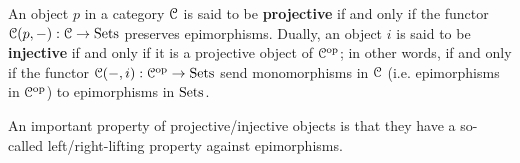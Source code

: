                 \begin{definition} \label{def: projective_and_injective_objects}  
                    An object $p$ in a category $\mathcal{C}$ is said to be \textbf{projective} if and only if the functor $\mathcal{C}(p, -): \mathcal{C} \to \mathrm{Sets}$ preserves epimorphisms. Dually, an object $i$ is said to be \textbf{injective} if and only if it is a projective object of $\mathcal{C}^{\mathrm{op}}$; in other words, if and only if the functor $\mathcal{C}(-, i): \mathcal{C}^{\mathrm{op}} \to \mathrm{Sets}$ send monomorphisms in $\mathcal{C}$ (i.e. epimorphisms in $\mathcal{C}^{\mathrm{op}}$) to epimorphisms in $\mathrm{Sets}$.
                \end{definition}
                
                An important property of projective/injective objects is that they have a so-called left/right-lifting property against epimorphisms. 
